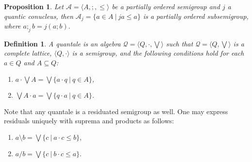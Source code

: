 \documentclass[a4paper]{article}
\theoremstyle{defin}
\newtheorem{defin}{Definition}
\theoremstyle{theorem}
\theoremstyle{prop}
\newtheorem{prop}{Proposition}
\theoremstyle{lemma}
\theoremstyle{ex}
\theoremstyle{col}
\theoremstyle{claim}
\begin{document}
\begin{prop} \label{subsemi}
  Let $\mathcal{A} = \langle A, ;, \leq \rangle$ be a partially ordered semigroup and $j$ a quantic conucleus, then
  $\mathcal{A}_j = \{ a \in A \: | \: j a \leq a \}$ is a partially ordered subsemigroup, where $a ;_j b = j(a ; b)$.
\end{prop}

\begin{defin}
  A quantale is an algebra $\mathcal{Q} = \langle Q, \cdot, \bigvee \rangle$ such that $\mathcal{Q} = \langle Q, \bigvee \rangle$ is a complete lattice, $\langle Q, \cdot \rangle$ is a semigroup, and the following conditions hold for each $a \in Q$ and $A \subseteq Q$:
  \begin{enumerate}
    \item $a \cdot \bigvee A = \bigvee \{ a \cdot q \: | \: q \in A \}$,
    \item $\bigvee A \cdot a = \bigvee \{ q \cdot a \: | \: q \in A \}$.
  \end{enumerate}
\end{defin}
Note that any quantale is a residuated semigroup as well. One may express residuals uniquely with suprema and products as follows:
\begin{enumerate}
  \item $a \setminus b = \bigvee \{ c \: | \: a \cdot c \leq b \}$,
  \item $a / b = \bigvee \{ c \: | \: b \cdot c \leq a \}$.
\end{enumerate}
\end{document}
